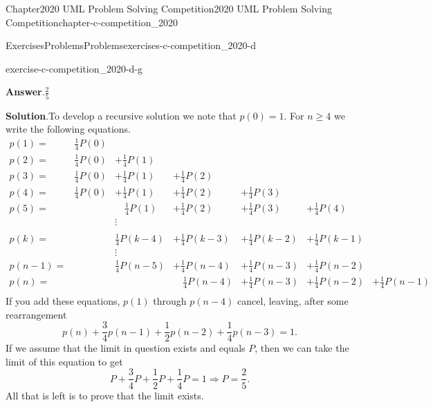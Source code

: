 \documentclass[oneside,10pt,]{book}
\newcommand{\blocktitlefont}{\relax}
\numberwithin{equation}{section}
\begin{document}
\begin{chapterptx}{Chapter}{2020 UML Problem Solving Competition}{}{2020 UML Problem Solving Competition}{}{}{chapter-c-competition_2020}
\begin{exercises-section}{Exercises}{Problems}{}{Problems}{}{}{exercises-c-competition_2020-d}
\begin{divisionexercise}{6}{}{}{exercise-c-competition_2020-d-g}
\par\smallskip%
\noindent\textbf{\blocktitlefont Answer}.\hypertarget{answer-c-competition_2020-d-g-b}{}\quad{}\(\frac{2}{5}\)%
\par\smallskip%
\noindent\textbf{\blocktitlefont Solution}.\hypertarget{solution-c-competition_2020-d-g-c}{}\quad{}To develop a recursive solution we note that \(p(0)=1\). For \(n \geq 4\) we write the following equations.%
\begin{equation*}
\begin{array}{ccccccc}
p(1)=&\frac{1}{4} P(0)&&&&&\\
p(2)=&\frac{1}{4} P(0)&+\frac{1}{4} P(1)&&&&\\
p(3)=&\frac{1}{4} P(0)&+\frac{1}{4} P(1)&+\frac{1}{4} P(2)&&&\\
p(4)=&\frac{1}{4} P(0)&+\frac{1}{4} P(1)&+\frac{1}{4} P(2)&+\frac{1}{4} P(3)&&\\
p(5)=& &\quad \frac{1}{4} P(1)&+\frac{1}{4} P(2)&+\frac{1}{4} P(3)&+\frac{1}{4} P(4)&\\
& & \vdots\\&&&&\\
p(k)=& & \frac{1}{4} P(k-4)&+\frac{1}{4} P(k-3)&+\frac{1}{4} P(k-2)&+\frac{1}{4} P(k-1)&\\
& & \vdots&&&&\\
p(n-1)= &&\frac{1}{4} P(n-5)&+\frac{1}{4} P(n-4)&+\frac{1}{4} P(n-3)&+\frac{1}{4} P(n-2)& \\
p(n)= & &&\quad \frac{1}{4} P(n-4)&+\frac{1}{4} P(n-3)&+\frac{1}{4} P(n-2)&+\frac{1}{4} P(n-1)\\
\end{array}
\end{equation*}
If you add these equations, \(p(1)\) through \(p(n-4)\) cancel, leaving, after some rearrangement%
\begin{equation*}
p(n) + \frac{3}{4} p(n-1)+\frac{1}{2} p(n-2) + \frac{1}{4} p(n-3)=1.
\end{equation*}
If we assume that the limit in question exists and equals \(P\), then we can take the limit of this equation to get%
\begin{equation*}
P+\frac{3}{4} P+\frac{1}{2} P + \frac{1}{4} P=1 \Rightarrow P = \frac{2}{5}.
\end{equation*}
All that is left is to prove that the limit exists.%
\end{divisionexercise}%
\end{exercises-section}
\end{chapterptx}
%
%
\typeout{************************************************}
\end{document}
